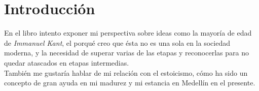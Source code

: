 \documentclass{article}
\begin{document}
\section{Introducción}
En el libro intento exponer mi perspectiva sobre ideas como la mayoría de edad de \textit{Immanuel Kant}, el porqué creo que ésta no es una sola en la sociedad moderna, y la necesidad de superar varias de las etapas y reconocerlas para no quedar atascados en etapas intermedias. \\

También me gustaría hablar de mi relación con el estoicismo, cómo ha sido un concepto de gran ayuda en mi madurez y mi estancia en Medellín en el presente. \\
\end{document}
